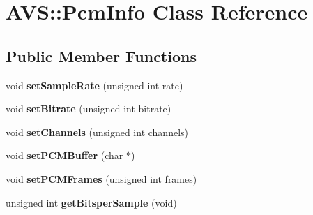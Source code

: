 \hypertarget{classAVS_1_1PcmInfo}{}\section{A\+VS\+:\+:Pcm\+Info Class Reference}
\label{classAVS_1_1PcmInfo}
\subsection*{Public Member Functions}
\begin{DoxyCompactItemize}
\item 
\mbox{\label{classAVS_1_1PcmInfo_af7014e362ccaed0bb5c20b94fe4ae2dd}} 
void {\bfseries set\+Sample\+Rate} (unsigned int rate)
\item 
\mbox{\label{classAVS_1_1PcmInfo_a6aa46341c7555dd6daa0b82c2b2ca56d}} 
void {\bfseries set\+Bitrate} (unsigned int bitrate)
\item 
\mbox{\label{classAVS_1_1PcmInfo_adb3d46bfe7fa86e83a8fac9371ad612e}} 
void {\bfseries set\+Channels} (unsigned int channels)
\item 
\mbox{\label{classAVS_1_1PcmInfo_a64d536360ff5fc9539e3ebca04ab29e9}} 
void {\bfseries set\+P\+C\+M\+Buffer} (char $\ast$)
\item 
\mbox{\label{classAVS_1_1PcmInfo_aff043a83508f407c2ddc770a8a7e4133}} 
void {\bfseries set\+P\+C\+M\+Frames} (unsigned int frames)
\item 
\mbox{\label{classAVS_1_1PcmInfo_a6cec6d29e2e079681c14bfe9383d7baf}} 
unsigned int {\bfseries get\+Bitsper\+Sample} (void)
\end{DoxyCompactItemize}
